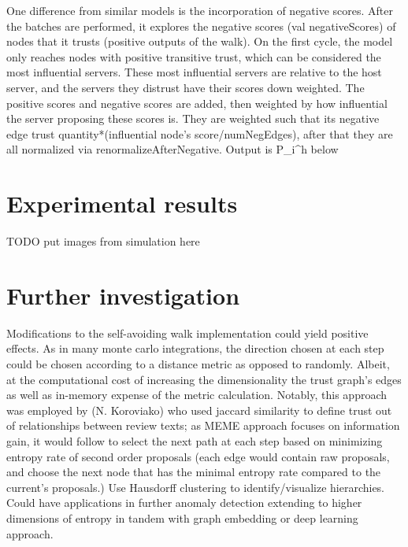 \documentclass{article}
\begin{document}
One difference from similar models is the incorporation of negative scores. After the batches are performed, it explores the negative scores (val negativeScores) of nodes that it trusts (positive outputs of the walk). On the first cycle, the model only reaches nodes with positive transitive trust, which can be considered the most influential servers. These most influential servers are relative to the host server, and the servers they distrust have their scores down weighted. The positive scores and negative scores are added, then weighted by how influential the server proposing these scores is. They are weighted such that its negative edge trust quantity*(influential node’s score/numNegEdges), after that they are all normalized via renormalizeAfterNegative.
Output is P_i^h below

\section{Experimental results}
TODO put images from simulation here

\section{Further investigation}
Modifications to the self-avoiding walk implementation could yield positive effects. As in many monte carlo integrations, the direction chosen at each step could be chosen according to a distance metric as opposed to randomly. Albeit, at the computational cost of increasing the dimensionality the trust graph’s edges as well as in-memory expense of the metric calculation. Notably, this approach was employed by (N. Koroviako) who used jaccard similarity to define trust out of relationships between review texts; as MEME approach focuses on information gain, it would follow to select the next path at each step based on minimizing entropy rate of second order proposals (each edge would contain raw proposals, and choose the next node that has the minimal entropy rate compared to the current’s proposals.)
	Use Hausdorff clustering to identify/visualize hierarchies. Could have applications in further anomaly detection extending to higher dimensions of entropy in tandem with graph embedding or deep learning approach.
\end{document}

